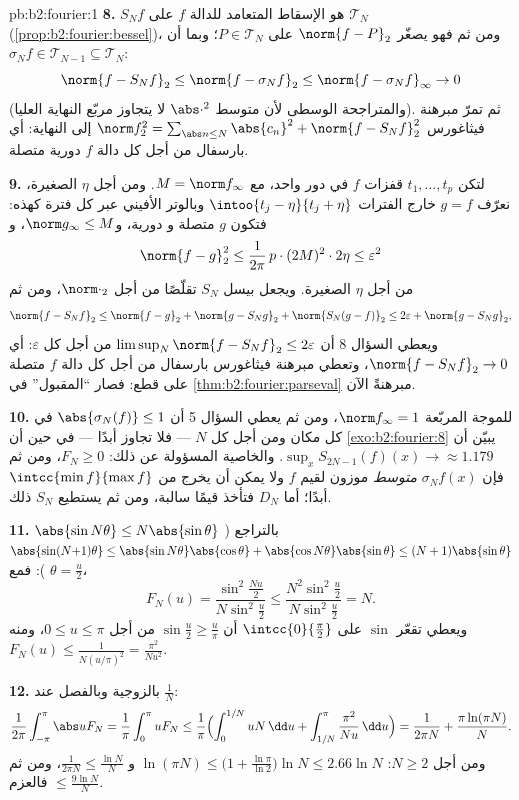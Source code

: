 \begin{solution}{pb:b2:fourier:1}
\textbf{8.} $S_Nf$ هو الإسقاط المتعامد للدالة $f$ على
$\mathcal T_N$ (\cref{prop:b2:fourier:bessel})، ومن ثم فهو يصغّر
$\norm{f - P}_2$ على $P \in \mathcal T_N$؛ وبما أن $\sigma_Nf
\in \mathcal T_{N-1} \subseteq \mathcal T_N$:
\[
\norm{f - S_Nf}_2 \leq \norm{f - \sigma_Nf}_2
\leq \norm{f - \sigma_Nf}_\infty \to 0
\]
(والمتراجحة الوسطى لأن متوسط $\abs\cdot^2$ لا يتجاوز
مربّع النهاية العليا). ثم تمرّ مبرهنة فيثاغورس $\norm f_2^2 = \sum_{\abs
n\leq N}\abs{c_n}^2 + \norm{f - S_Nf}_2^2$ إلى
النهاية: أي بارسفال من أجل كل دالة $f$ دورية متصلة.

\textbf{9.} لتكن $t_1, \dots, t_p$ قفزات $f$ في
دور واحد، مع $M = \norm f_\infty$. ومن أجل $\eta$ الصغيرة، نعرّف $g = f$
خارج الفترات $\intoo{t_j - \eta}{t_j + \eta}$ وبالوتر
الأفيني عبر كل فترة كهذه: فتكون $g$ متصلة و
دورية، و$\norm g_\infty \leq M$، و
\[
\norm{f - g}_2^2 \leq \frac{1}{2\pi}\,p\cdot(2M)^2\cdot2\eta
\leq \varepsilon^2
\]
من أجل $\eta$ الصغيرة. ويجعل بيسل $S_N$ تقلّصًا من أجل
$\norm\cdot_2$، ومن ثم
\[
\norm{f - S_Nf}_2
\leq \norm{f - g}_2 + \norm{g - S_Ng}_2 + \norm{S_N(g -
f)}_2
\leq 2\varepsilon + \norm{g - S_Ng}_2 ,
\]
ويعطي السؤال 8 أن $\limsup_N\norm{f - S_Nf}_2 \leq
2\varepsilon$ من أجل كل $\varepsilon$: أي $\norm{f - S_Nf}_2 \to
0$، وتعطي مبرهنة فيثاغورس بارسفال من أجل كل دالة $f$
متصلة على قطع: فصار ``المقبول'' في
\cref{thm:b2:fourier:parseval} مبرهنةً الآن.

\textbf{10.} للموجة المربّعة $\norm f_\infty = 1$، ومن ثم
يعطي السؤال 5 أن $\abs{\sigma_N(f)} \leq 1$ في كل مكان ومن أجل
كل $N$ --- فلا تجاوز أبدًا --- في حين أن
\cref{exo:b2:fourier:8} يبيّن أن $\sup_xS_{2N-1}(f)(x) \to
\approx 1.179$. والخاصية المسؤولة عن ذلك: $F_N \geq 0$، ومن ثم فإن
$\sigma_Nf(x)$ \emph{متوسط} موزون لقيم $f$
ولا يمكن أن يخرج من $\intcc{\min f}{\max f}$ أبدًا؛ أما $D_N$ فتأخذ
قيمًا سالبة، ومن ثم يستطيع $S_N$ ذلك.

\textbf{11.} $\abs{\sin N\theta} \leq N\abs{\sin\theta}$ بالتراجع
($\abs{\sin(N{+}1)\theta} \leq
\abs{\sin N\theta}\abs{\cos\theta} +
\abs{\cos N\theta}\abs{\sin\theta} \leq
(N+1)\abs{\sin\theta}$): فمع $\theta = \frac u2$،
\[
F_N(u) = \frac{\sin^2\frac{Nu}2}{N\sin^2\frac u2}
\leq \frac{N^2\sin^2\frac u2}{N\sin^2\frac u2} = N .
\]
ويعطي تقعّر $\sin$ على $\intcc{0}{\frac\pi2}$
أن $\sin\frac u2 \geq \frac{u}{\pi}$ من أجل $0 \leq u \leq \pi$، ومنه
$F_N(u) \leq \frac{1}{N(u/\pi)^2} = \frac{\pi^2}{Nu^2}$.

\textbf{12.} بالزوجية وبالفصل عند $\frac1N$:
\[
\frac{1}{2\pi}\int_{-\pi}^{\pi}\abs uF_N
= \frac1\pi\int_0^\pi uF_N
\leq \frac1\pi\Bigl(\int_0^{1/N}uN\,\dd u +
\int_{1/N}^{\pi}\frac{\pi^2}{Nu}\,\dd u\Bigr)
= \frac{1}{2\pi N} + \frac{\pi\ln(\pi N)}{N} .
\]
ومن أجل $N \geq 2$: $\ln(\pi N) \leq \bigl(1 +
\frac{\ln\pi}{\ln2}\bigr)\ln N \leq 2.66\ln N$ و
$\frac{1}{2\pi N} \leq \frac{\ln N}{N}$، ومن ثم فالعزم
$\leq \frac{9\ln N}{N}$.


\end{solution}
